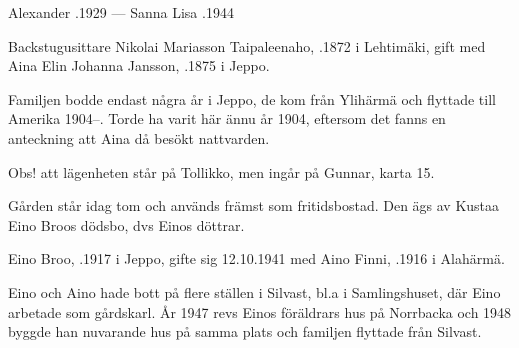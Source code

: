Alexander .1929  ---  Sanna Lisa .1944


%
Backstugusittare Nikolai Mariasson Taipaleenaho, .1872 i Lehtimäki, gift med Aina Elin Johanna Jansson, .1875 i Jeppo.
\begin{jhchildren}
  \item {}
  \item {}
  \item {}
\end{jhchildren}

Familjen bodde endast några år i Jeppo, de kom från Ylihärmä och flyttade till Amerika 1904--. Torde ha varit här ännu år 1904, eftersom det fanns en anteckning att Aina då besökt nattvarden.



%

Obs! att lägenheten står på Tollikko, men ingår på Gunnar, karta 15.


%
Gården står idag tom och används främst som fritidsbostad. Den ägs av Kustaa Eino Broos dödsbo, dvs Einos döttrar.


%
Eino Broo, .1917 i Jeppo, gifte sig 12.10.1941 med Aino Finni, .1916 i Alahärmä.
\begin{jhchildren}
  \item {}
  \item {}
  \item {}
  \item {}
\end{jhchildren}
Eino och Aino hade bott på flere ställen i Silvast, bl.a i Samlingshuset, där Eino arbetade som gårdskarl. År 1947 revs Einos föräldrars hus på Norrbacka och 1948 byggde han nuvarande hus på samma plats och familjen flyttade från Silvast.

